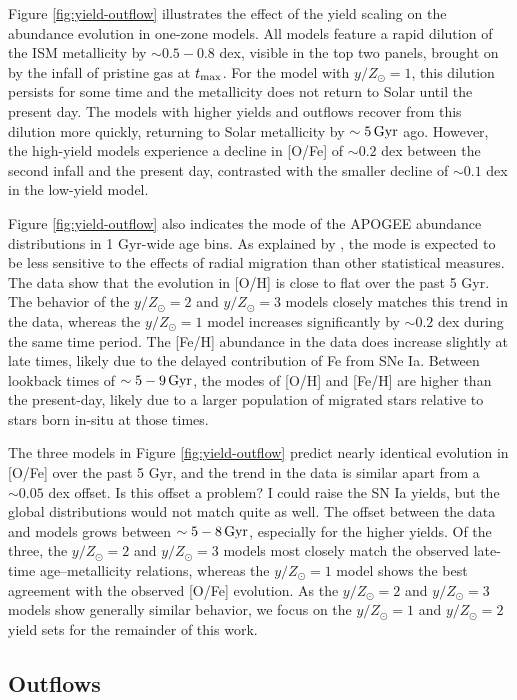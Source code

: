\documentclass[twocolumn,twocolappendix,linenumbers]{aastex631}
\newcommand{\yZ}[1]{$y/Z_\odot=#1$}
\newcommand{\todo}[1]{{\color{red}#1}}
\begin{document}
Figure \ref{fig:yield-outflow} illustrates the effect of the yield scaling on the abundance evolution in one-zone models. All models feature a rapid dilution of the ISM metallicity by $\sim0.5-0.8$ dex, visible in the top two panels, brought on by the infall of pristine gas at $t_{\rm max}$. For the model with $y/Z_\odot=1$, this dilution persists for some time and the metallicity does not return to Solar until the present day. The models with higher yields and outflows recover from this dilution more quickly, returning to Solar metallicity by $\sim5\,{\rm Gyr}$ ago. However, the high-yield models experience a decline in [O/Fe] of $\sim0.2$ dex between the second infall and the present day, contrasted with the smaller decline of $\sim0.1$ dex in the low-yield model.

Figure \ref{fig:yield-outflow} also indicates the mode of the APOGEE abundance distributions in 1 Gyr-wide age bins. As explained by \citet{johnson_milky_2024}, the mode is expected to be less sensitive to the effects of radial migration than other statistical measures. The data show that the evolution in [O/H] is close to flat over the past 5 Gyr. The behavior of the $y/Z_\odot=2$ and $y/Z_\odot=3$ models closely matches this trend in the data, whereas the $y/Z_\odot=1$ model increases significantly by $\sim0.2$ dex during the same time period. The [Fe/H] abundance in the data does increase slightly at late times, likely due to the delayed contribution of Fe from SNe Ia. Between lookback times of $\sim5-9\,{\rm Gyr}$, the modes of [O/H] and [Fe/H] are higher than the present-day, likely due to a larger population of migrated stars relative to stars born in-situ at those times. 

The three models in Figure \ref{fig:yield-outflow} predict nearly identical evolution in [O/Fe] over the past 5 Gyr, and the trend in the data is similar apart from a $\sim0.05$ dex offset. \todo{Is this offset a problem? I could raise the SN Ia yields, but the global distributions would not match quite as well.} The offset between the data and models grows between $\sim5-8\,{\rm Gyr}$, especially for the higher yields. Of the three, the \yZ{2} and \yZ{3} models most closely match the observed late-time age--metallicity relations, whereas the \yZ{1} model shows the best agreement with the observed [O/Fe] evolution. As the $y/Z_\odot=2$ and $y/Z_\odot=3$ models show generally similar behavior, we focus on the $y/Z_\odot=1$ and $y/Z_\odot=2$ yield sets for the remainder of this work.

\subsection{Outflows}
\label{sec:outflows}
\end{document}
